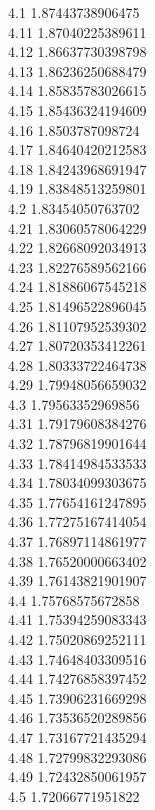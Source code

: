 {4.1	1.87443738906475\\
4.11	1.87040225389611\\
4.12	1.86637730398798\\
4.13	1.86236250688479\\
4.14	1.85835783026615\\
4.15	1.85436324194609\\
4.16	1.8503787098724\\
4.17	1.84640420212583\\
4.18	1.84243968691947\\
4.19	1.83848513259801\\
4.2	1.83454050763702\\
4.21	1.83060578064229\\
4.22	1.82668092034913\\
4.23	1.82276589562166\\
4.24	1.81886067545218\\
4.25	1.81496522896045\\
4.26	1.81107952539302\\
4.27	1.80720353412261\\
4.28	1.80333722464738\\
4.29	1.79948056659032\\
4.3	1.79563352969856\\
4.31	1.79179608384276\\
4.32	1.78796819901644\\
4.33	1.78414984533533\\
4.34	1.78034099303675\\
4.35	1.77654161247895\\
4.36	1.77275167414054\\
4.37	1.76897114861977\\
4.38	1.76520000663402\\
4.39	1.76143821901907\\
4.4	1.75768575672858\\
4.41	1.75394259083343\\
4.42	1.75020869252111\\
4.43	1.74648403309516\\
4.44	1.74276858397452\\
4.45	1.73906231669298\\
4.46	1.73536520289856\\
4.47	1.73167721435294\\
4.48	1.72799832293086\\
4.49	1.72432850061957\\
4.5	1.72066771951822\\
}
